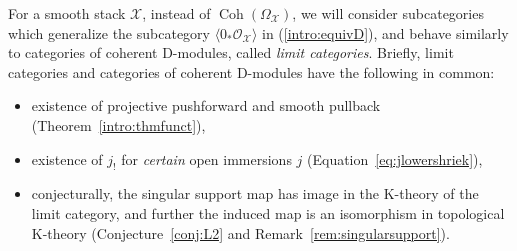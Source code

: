 \documentclass [11pt,oneside,a4paper,mathscr]{amsart}
\theoremstyle{definition}
\newcommand{\X}{\mathcal{X}}
\newcommand{\Coh}{\operatorname{Coh}}
\begin{document}
For a smooth stack $\X$, 
instead of $\Coh(\Omega_{\X})$, we will consider subcategories 
which generalize the subcategory $\langle 0_{*}\mathcal{O}_{\X}\rangle$ in (\ref{intro:equivD}), 
and behave similarly to categories of coherent D-modules, called \textit{limit categories}. 
Briefly, limit categories and categories of coherent D-modules have the following in common:
\begin{itemize}
    \item existence of projective pushforward and smooth pullback (Theorem~\ref{intro:thmfunct}),
    \item existence of $j_!$ for \textit{certain} open immersions $j$ (Equation~\eqref{eq:jlowershriek}),
    \item conjecturally, the singular support map has image in the K-theory of the limit category, and further the induced map is an isomorphism in topological K-theory (Conjecture~\ref{conj:L2} and Remark~\ref{rem:singularsupport}).
\end{itemize}
\end{document}

